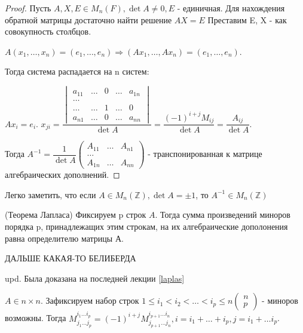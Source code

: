 \begin{proof}
	Пусть \(A, X, E\in M_n(F), \det A\ne 0, E\) - единичная.
	 Для нахождения обратной матрицы достаточно найти решение \(AX = E\)
	Преставим E, X - как совокупность столбцов. 
	
	\(A(x_1, \ldots, x_n) = (e_1, \ldots, e_n) \Longrightarrow (Ax_1, \ldots, Ax_n) = (e_1, \ldots, e_n)\). 
	
	Тогда система распадается на n систем:
	
	\(Ax_i = e_i\). \(x_{ji} = \dfrac{\begin{vmatrix}
			a_{11} & \ldots &0 & \ldots &a_{1n} \\
			\ldots \\
			\ldots & \ldots & 1 & \ldots & 0  \\
			a_{n1} & \ldots & 0 & \ldots & a_{nn} 
	\end{vmatrix}}{\det A} = \dfrac{(-1)^{i+j}M_{ij}}{\det A} = \dfrac{A_{ij}}{\det A}\). 
	
	
	Тогда \(A^{-1} = \dfrac{1}{\det A}\begin{pmatrix}
	A_{11} &\ldots & A_{n1} \\ 
	\ldots \\ 
	A_{1n} & \ldots &  A_{nn}
\end{pmatrix}\) - транспонированная к матрице алгебраических дополнений.
\end{proof}
Легко заметить, что если \(A\in M_{n}(\mathbb{Z}), \det A = \pm 1\), то \(A^{-1}\in M_{n}(\mathbb{Z})\)
\begin{theorem}
	(Теорема Лапласа) \newline
	Фиксируем p строк \(A\). Тогда сумма произведений миноров порядка p, принадлежащих этим строкам, на их алгебраические дополонения равна определителю матрицы А.
\end{theorem}
ДАЛЬШЕ КАКАЯ-ТО БЕЛИБЕРДА \newline

upd. Была доказана на последней лекции \eqref{laplas}

\(A\in {n\times n}\). Зафиксируем набор строк \(1\le i_1 < i_2 <\ldots < i_p\le n \begin{pmatrix}
	n \\ p
\end{pmatrix}\) - миноров возможны. Тогда \(M_{j_{1}\ldots j_{p}}^{i_{1}\ldots i_{p}} = (-1)^{i+j}M_{j_{p+1}\ldots j_{n}}^{i_{p+1}\ldots i_{n}}, i = i_1 + \ldots + i_p, j = i_1 + \ldots i_p\). 
